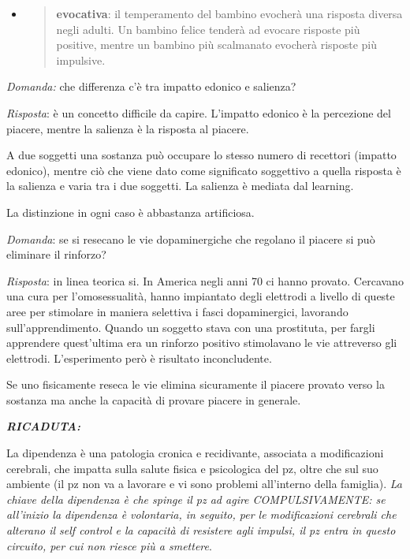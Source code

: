 \documentclass[]{article}
\begin{document}
\begin{itemize}
\item
  \begin{quote}
  \textbf{evocativa}: il temperamento del bambino evocherà una risposta
  diversa negli adulti. Un bambino felice tenderà ad evocare risposte
  più positive, mentre un bambino più scalmanato evocherà risposte più
  impulsive.
  \end{quote}
\end{itemize}

\emph{Domanda:} che differenza c'è tra impatto edonico e salienza?

\emph{Risposta}: è un concetto difficile da capire. L'impatto edonico è
la percezione del piacere, mentre la salienza è la risposta al piacere.

A due soggetti una sostanza può occupare lo stesso numero di recettori
(impatto edonico), mentre ciò che viene dato come significato soggettivo
a quella risposta è la salienza e varia tra i due soggetti. La salienza
è mediata dal learning.

La distinzione in ogni caso è abbastanza artificiosa.

\emph{Domanda}: se si resecano le vie dopaminergiche che regolano il
piacere si può eliminare il rinforzo?

\emph{Risposta}: in linea teorica si. In America negli anni 70 ci hanno
provato. Cercavano una cura per l'omosessualità, hanno impiantato degli
elettrodi a livello di queste aree per stimolare in maniera selettiva i
fasci dopaminergici, lavorando sull'apprendimento. Quando un soggetto
stava con una prostituta, per fargli apprendere quest'ultima era un
rinforzo positivo stimolavano le vie attreverso gli elettrodi.
L'esperimento però è risultato inconcludente.

Se uno fisicamente reseca le vie elimina sicuramente il piacere provato
verso la sostanza ma anche la capacità di provare piacere in generale.

\textbf{\emph{RICADUTA:}}

La dipendenza è una patologia cronica e recidivante, associata a
modificazioni cerebrali, che impatta sulla salute fisica e psicologica
del pz, oltre che sul suo ambiente (il pz non va a lavorare e vi sono
problemi all'interno della famiglia). \emph{La chiave della dipendenza è
che spinge il pz ad agire COMPULSIVAMENTE: se all'inizio la dipendenza è
volontaria, in seguito, per le modificazioni cerebrali che alterano il
self control e la capacità di resistere agli impulsi, il pz entra in
questo circuito, per cui non riesce più a smettere}.
\end{document}
